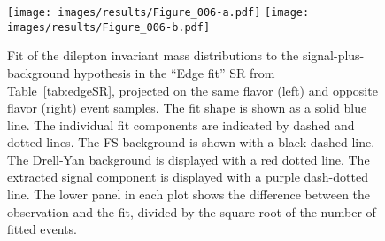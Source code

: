 \begin{figure}[!hbtp]
\centering
\texttt{[image: images/results/Figure\_006-a.pdf]}
\texttt{[image: images/results/Figure\_006-b.pdf]}
\caption{Fit of the dilepton invariant mass distributions to the signal-plus-background hypothesis in the ``Edge fit'' SR from Table~\ref{tab:edgeSR}, projected on the same flavor (left) and opposite flavor (right) event samples. The fit shape is shown as a solid blue line. The individual fit components are indicated by dashed and dotted lines. The FS background is shown with a black dashed line. The Drell-Yan background is displayed with a red dotted line. The extracted signal component is displayed with a purple dash-dotted line. The lower panel in each plot shows the difference between the observation and the fit, divided by the square root of the number of fitted events.}
\label{fig:Fit_data_H1}
\end{figure}


